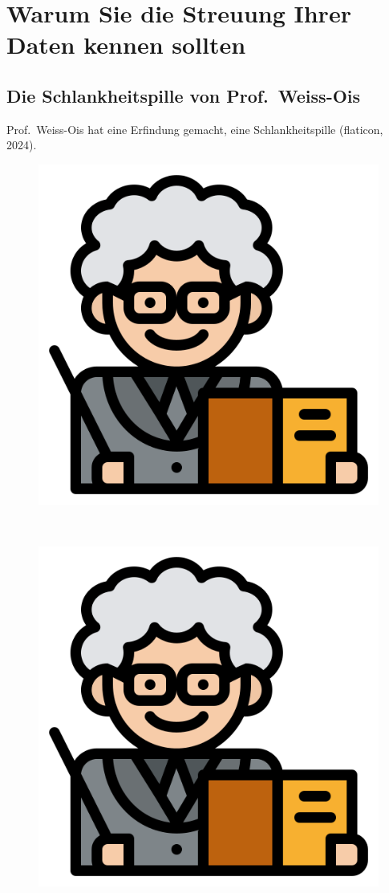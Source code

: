 \documentclass[
  letterpaper,
]{scrbook}
\theoremstyle{definition}
\theoremstyle{definition}
\theoremstyle{definition}
\theoremstyle{remark}
\begin{document}
\section{Warum Sie die Streuung Ihrer Daten kennen
sollten}\label{warum-sie-die-streuung-ihrer-daten-kennen-sollten}

\subsection{Die Schlankheitspille von
Prof.~Weiss-Ois}\label{sec-weiss-ois}

Prof.~Weiss-Ois hat eine Erfindung gemacht, eine Schlankheitspille
(flaticon, 2024).

\begin{figure}

\begin{minipage}{0.46\linewidth}

\includegraphics[width=0.25\linewidth,height=\textheight,keepaspectratio]{img/teacher.png}

\end{minipage}%
%
\begin{minipage}{0.09\linewidth}
~\end{minipage}%
%
\begin{minipage}{0.46\linewidth}

\includegraphics[width=0.25\linewidth,height=\textheight,keepaspectratio]{img/teacher.png}

\end{minipage}%

\end{figure}%
\end{document}

